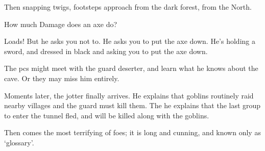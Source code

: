 \begin{multicols}{2}
\begin{description}
  Then snapping twigs, footsteps approach from the dark forest, from the North.
  \item[Player 2:]
  How much Damage does an axe do?
  \item[\Glsentrytext{gm}:]
  Loads!
  But he asks you not to.
  He asks you to put the axe down.
  He's holding a sword, and dressed in black and asking you to put the axe down.
\end{description}

\bigLine
\vspace{2em}
\noindent
The \glspl{pc} might meet with the \gls{guard} deserter, and learn what he knows about the cave.
Or they may miss him entirely.

Moments later, the \gls{jotter} finally arrives.
He explains that goblins routinely raid nearby \glspl{village} and the \gls{guard} must kill them.
The he explains that the last group to enter the tunnel fled, and will be killed along with the goblins.

Then comes the most terrifying of foes; it is long and cunning, and known only as `glossary'.

\end{multicols}

